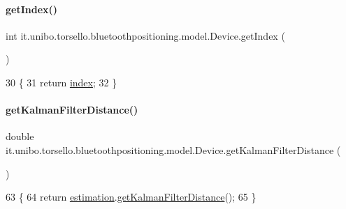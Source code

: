 \paragraph{\texorpdfstring{get\+Index()}{getIndex()}}
{\footnotesize\ttfamily int it.\+unibo.\+torsello.\+bluetoothpositioning.\+model.\+Device.\+get\+Index (\begin{DoxyParamCaption}{ }\end{DoxyParamCaption})}


\begin{DoxyCode}
30                           \{
31         \textcolor{keywordflow}{return} \hyperlink{classit_1_1unibo_1_1torsello_1_1bluetoothpositioning_1_1model_1_1Device_a55a01164b2388451f5e8344bfbc61ccc_a55a01164b2388451f5e8344bfbc61ccc}{index};
32     \}
\end{DoxyCode}
\hypertarget{classit_1_1unibo_1_1torsello_1_1bluetoothpositioning_1_1model_1_1Device_aa86454f965d50f015f1f40abe2d0d19a_aa86454f965d50f015f1f40abe2d0d19a}{}\label{classit_1_1unibo_1_1torsello_1_1bluetoothpositioning_1_1model_1_1Device_aa86454f965d50f015f1f40abe2d0d19a_aa86454f965d50f015f1f40abe2d0d19a} 
\paragraph{\texorpdfstring{get\+Kalman\+Filter\+Distance()}{getKalmanFilterDistance()}}
{\footnotesize\ttfamily double it.\+unibo.\+torsello.\+bluetoothpositioning.\+model.\+Device.\+get\+Kalman\+Filter\+Distance (\begin{DoxyParamCaption}{ }\end{DoxyParamCaption})}


\begin{DoxyCode}
63                                             \{
64         \textcolor{keywordflow}{return} \hyperlink{classit_1_1unibo_1_1torsello_1_1bluetoothpositioning_1_1model_1_1Device_ac619c42728cd40f41a5f12fde56b4425_ac619c42728cd40f41a5f12fde56b4425}{estimation}.\hyperlink{classit_1_1unibo_1_1torsello_1_1bluetoothpositioning_1_1distanceEstimation_1_1Estimation_a985e9b8b61c3d1e917a2e818b5f8b679_a985e9b8b61c3d1e917a2e818b5f8b679}{getKalmanFilterDistance}();
65     \}
\end{DoxyCode}
\hypertarget{classit_1_1unibo_1_1torsello_1_1bluetoothpositioning_1_1model_1_1Device_a34510d139c99bc9cfba247ab6ff1b16f_a34510d139c99bc9cfba247ab6ff1b16f}{}\label{classit_1_1unibo_1_1torsello_1_1bluetoothpositioning_1_1model_1_1Device_a34510d139c99bc9cfba247ab6ff1b16f_a34510d139c99bc9cfba247ab6ff1b16f} 
